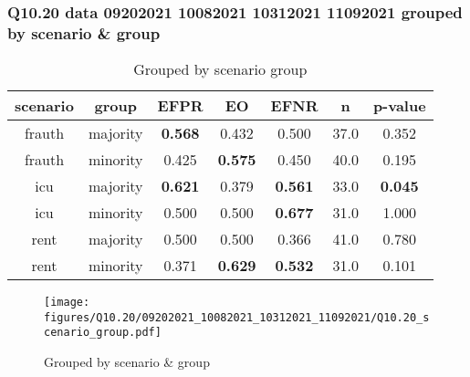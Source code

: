 \subsubsection{Q10.20 data 09202021 10082021 10312021 11092021 grouped by scenario \& group}

\begin{comment}
                        EFPR        EO      EFNR     n    pvalue
(frauth, majority)  0.567568  0.432432  0.500000  37.0  0.351657
(frauth, minority)  0.425000  0.575000  0.450000  40.0  0.195373
(icu, majority)     0.621212  0.378788  0.560606  33.0  0.045164
(icu, minority)     0.500000  0.500000  0.677419  31.0  1.000000
(rent, majority)    0.500000  0.500000  0.365854  41.0  0.779668
(rent, minority)    0.370968  0.629032  0.532258  31.0  0.101283
\end{comment}

\begin{table}[h]
    \centering
    \begin{tabular}{|c|c|c|c|c|c|c|}
        \hline
        scenario & group & EFPR & EO & EFNR & n & p-value\\
        \hline
        frauth & majority & \textbf{0.568} & 0.432 & 0.500 & 37.0 & 0.352\\
		frauth & minority & 0.425 & \textbf{0.575} & 0.450 & 40.0 & 0.195\\
		icu & majority & \textbf{0.621} & 0.379 & \textbf{0.561} & 33.0 & \textbf{0.045}\\
		icu & minority & 0.500 & 0.500 & \textbf{0.677} & 31.0 & 1.000\\
		rent & majority & 0.500 & 0.500 & 0.366 & 41.0 & 0.780\\
		rent & minority & 0.371 & \textbf{0.629} & \textbf{0.532} & 31.0 & 0.101\\
		
        \hline
    \end{tabular}
    \caption{Grouped by scenario group}
    \label{tab:my_label}
\end{table}
\begin{figure}[h]
    \centering
    \texttt{[image: figures/Q10.20/09202021\_10082021\_10312021\_11092021/Q10.20\_scenario\_group.pdf]}
    \caption{Grouped by scenario \& group}
    \label{fig:my_label}
\end{figure}

